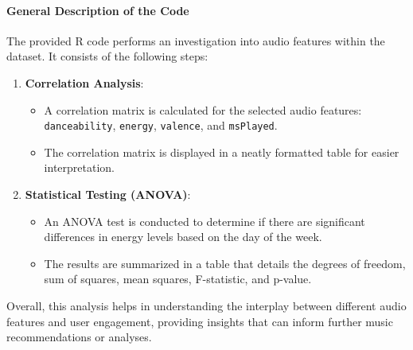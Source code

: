 \documentclass[
]{article}
\providecommand{\tightlist}{%
  \setlength{\itemsep}{0pt}\setlength{\parskip}{0pt}}
\begin{document}
\paragraph{General Description of the
Code}\label{general-description-of-the-code}

The provided R code performs an investigation into audio features within
the dataset. It consists of the following steps:

\begin{enumerate}
\def\labelenumi{\arabic{enumi}.}
\tightlist
\item
  \textbf{Correlation Analysis}:

  \begin{itemize}
  \tightlist
  \item
    A correlation matrix is calculated for the selected audio features:
    \texttt{danceability}, \texttt{energy}, \texttt{valence}, and
    \texttt{msPlayed}.
  \item
    The correlation matrix is displayed in a neatly formatted table for
    easier interpretation.
  \end{itemize}
\item
  \textbf{Statistical Testing (ANOVA)}:

  \begin{itemize}
  \tightlist
  \item
    An ANOVA test is conducted to determine if there are significant
    differences in energy levels based on the day of the week.
  \item
    The results are summarized in a table that details the degrees of
    freedom, sum of squares, mean squares, F-statistic, and p-value.
  \end{itemize}
\end{enumerate}

Overall, this analysis helps in understanding the interplay between
different audio features and user engagement, providing insights that
can inform further music recommendations or analyses.
\end{document}
